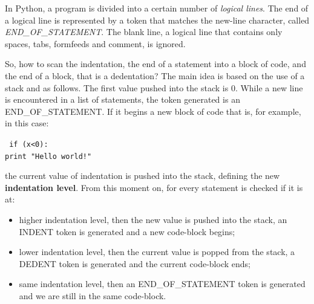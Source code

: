 \documentclass[a4paper,12pt,,titlepage,openright]{report}
\newcommand\tab[1][1cm]{\hspace*{#1}}
\begin{document}
In Python, a program is divided into a certain number of \textit{logical lines}. The end of a logical line is represented by a token that matches the new-line character, called \textit{END\_OF\_STATEMENT}.
The blank line, a logical line that contains only spaces, tabs, formfeeds and comment, is ignored.

So, how to scan the indentation, the end of a statement into a block of code, and the end of a block, that is a dedentation?
The main idea is based on the use of a stack and as follows.
The first value pushed into the stack is $0$. While a new line is encountered in a list of statements, the token generated is an END\_OF\_STATEMENT. If it begins a new block of code that is, for example, in this case:

\begin{flushleft}
\texttt{
if (x<0):
\\ \tab print "Hello world!" }
\end{flushleft}

the current value of indentation is pushed into the stack, defining the new \textbf{indentation level}. From this moment on, for every statement is checked if it is at:
\begin{itemize}
\item higher indentation level, then the new value is pushed into the stack, an INDENT token is generated and a new code-block begins;
\item lower indentation level, then the current value is popped from the stack, a DEDENT token is generated and the current code-block ends;
\item same indentation level, then an END\_OF\_STATEMENT token is generated and we are still in the same code-block.
\end{itemize}
\end{document}

